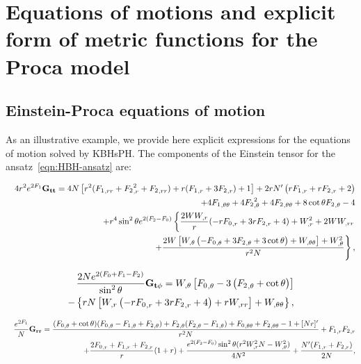 \chapter{Equations of motions and explicit form of metric functions for the Proca model}
\label{appendixb}

\section{Einstein-Proca equations of motion}

As an illustrative example, we provide here explicit expressions for the equations of motion solved by KBHsPH. The components of the Einstein tensor for the ansatz~\eqref{eqn:HBH-ansatz} are:

\begin{eqnarray}
&&  4r^2  e^{2F_1}{\bf G_{tt}}= 4 
N \left[r^2 ({F_1}_{,rr}+ {F_2}_{,r}^2+
{F_2}_{,rr})
+r( 
{F_1}_{,r}+3  {F_2}_{,r})+1\right] + 2 r N'  \left(r 
{F_1}_{,r}+r {F_2}_{,r}+2\right)\nonumber \\
&&+4 {F_1}_{,\theta\theta}
%
 +4  
{F_2}_{,\theta}^2+4  {F_2}_{,\theta\theta}
%
+8
\cot \theta {F_2}_{,\theta}-4 
\nonumber \\
&& +r^4 \sin ^2\theta e^{2 ({F_2}-F_0)} 
 \left\{
 \frac{2W W_{,r}}{r}(- r {F_0}_{,r} +3r{F_2}_{,r}+4 )
 +W_{,r}^2+2W W_{,rr} 
 \right. \nonumber \\ 
%
&& \left. + \frac{2 W \left[W_{,\theta} \left(- 
{F_0}_{,\theta}+3 {F_2}_{,\theta}+3 \cot\theta\right)+ W_{,\theta\theta}\right]+ W_{,\theta}^2}{r^2N} \right\},
\end{eqnarray}

\begin{eqnarray}
\frac{2Ne^{2(F_0+F_1-F_2)}}{\sin^2\theta}{\bf G_{t\phi }}=   W_{,\theta} \left[ {F_0}_{,\theta}-3 \left( 
{F_2}_{,\theta}+\cot\theta\right)\right] \nonumber\\
-
\left\{r N 
\left[W_{,r} \left(-r {F_0}_{,r}+3 r 
{F_2}_{,r}+4\right)+r 
W_{,rr}\right]+W_{,\theta\theta}\right\}  ,
\end{eqnarray}



\begin{eqnarray}
&&  \frac{e^{2F_1}}{N}{\bf G_{rr}}= \frac{({F_0}_{,\theta}+\cot\theta)({F_0}_{,\theta}-{F_1}_{,\theta}+
{F_2}_{,\theta})+{F_2}_{,\theta}({F_2}_{,\theta}-{F_1}_{,\theta})
+{F_0}_{,\theta\theta}+{F_2}_{,\theta\theta}-1+[Nr]'}{r^2 N}+{F_1}_{,r} {F_2}_{,r}\nonumber \\
&& 
%
+\frac{2{F_0}_{,r}+{F_1}_{,r}+{F_2}_{,r}}{r}(1+r)+\frac{e^{2(
{F_2}- {F_0})} \sin ^2\theta (r^2W_{,r}^2N-W_{,\theta}^2 ) }{4 N^2} 
%
+\frac{N'( 
{F_1}_{,r}+{F_2}_{,r})}{2N},
\end{eqnarray}


